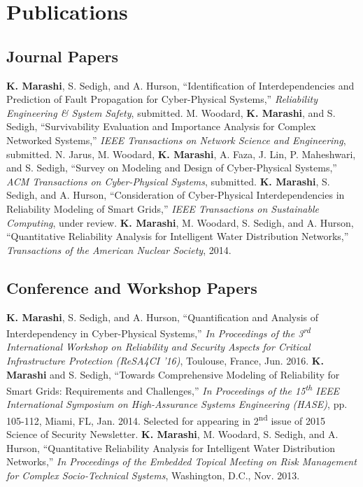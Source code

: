 \section{Publications}
\subsection{Journal Papers}
\begin{cvpubs}
  \cvpub
    {\textbf{K. Marashi}, S. Sedigh, and A. Hurson, ``Identification of Interdependencies and Prediction of Fault Propagation for Cyber-Physical Systems,'' \textit{Reliability Engineering \& System Safety}, submitted.}
  \cvpub
    {M. Woodard, \textbf{K. Marashi}, and S. Sedigh, ``Survivability Evaluation and Importance Analysis for Complex Networked Systems,'' \textit{IEEE Transactions on Network Science and Engineering}, submitted.}
  \cvpub
    {N. Jarus, M. Woodard, \textbf{K. Marashi}, A. Faza, J. Lin, P. Maheshwari, and S. Sedigh, ``Survey on Modeling and Design of Cyber-Physical Systems,'' \textit{ACM Transactions on Cyber-Physical Systems}, submitted.}
  \cvpub
    {\textbf{K. Marashi}, S. Sedigh, and A. Hurson, ``Consideration of Cyber-Physical Interdependencies in Reliability Modeling of Smart Grids,'' \textit{IEEE Transactions on Sustainable Computing}, under review.}
  \cvpub
    {\textbf{K. Marashi}, M. Woodard, S. Sedigh, and A. Hurson, ``Quantitative Reliability Analysis for Intelligent Water Distribution Networks,'' \textit{Transactions of the American Nuclear Society}, 2014.}
\end{cvpubs}

\subsection{Conference and Workshop Papers}
\begin{cvpubs}
  \cvpub
    {\textbf{K. Marashi}, S. Sedigh, and A. Hurson, ``Quantification and Analysis of Interdependency in Cyber-Physical Systems,'' \textit{In Proceedings of the 3\textsuperscript{rd} International Workshop on Reliability and Security Aspects for Critical Infrastructure Protection (ReSA4CI '16)}, Toulouse, France, Jun. 2016.}
  \cvpub
    {\textbf{K. Marashi} and S. Sedigh, ``Towards Comprehensive Modeling of Reliability for Smart Grids: Requirements and Challenges,'' \textit{In Proceedings of the 15\textsuperscript{th} IEEE International Symposium on High-Assurance Systems Engineering (HASE)}, pp. 105-112, Miami, FL, Jan. 2014. Selected for appearing in 2\textsuperscript{nd} issue of 2015 Science of Security Newsletter.}
  \cvpub
    {\textbf{K. Marashi}, M. Woodard, S. Sedigh, and A. Hurson, ``Quantitative Reliability Analysis for Intelligent Water Distribution Networks,'' \textit{In Proceedings of the Embedded Topical Meeting on Risk Management for Complex Socio-Technical Systems}, Washington, D.C., Nov. 2013.}
\end{cvpubs}
